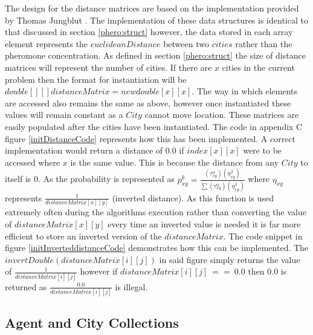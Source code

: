 The design for the distance matrices are based on the implementation provided by Thomas Jungblut \cite{tjung:aco:blog}. The implementation of these data structures is identical to that discussed in section \ref{phero:struct} however, the data stored in each array element represents the $euclideanDistance$ between two $cities$ rather than the pheromone concentration. As defined in section \ref{phero:struct} the size of distance matrices will represent the number of cities. If there are $x$ cities in the current problem then the format for instantiation will be $double[][] distanceMatrix = new double[x][x]$. The way in which elements are accessed also remains the same as above, however once instantiated these values will remain constant as a $City$ cannot move location. These matrices are easily populated after the cities have been instantiated. The code in appendix C figure \ref{initDistanceCode} represents how this has been implemented. A correct implementation would return a distance of $0.0$ if $index[x][x]$ were to be accessed where $x$ is the same value. This is because the distance from any $City$ to itself is 0.
As the probability is represented as $p_{xy}^{k} = \frac{(\tau_{xy}^{\alpha })(\eta _{xy}^{\beta })}{\sum (\tau_{xy}^{\alpha })(\eta _{xy}^{\beta })}$ where $\eta _{xy}$ represents $\frac{1}{distanceMatrix[x][y]}$ (inverted distance). As this function is used extremely often during the algorithms execution rather than converting the value of $distanceMatrix[x][y]$ every time an inverted value is needed it is far more efficient to store an inverted version of the $distanceMatrix$. The code snippet in figure \ref{initInverteddistanceCode} demonstrates how this can be implemented. The $invertDouble(distanceMatrix[i][j])$ in said figure simply returns the value of $\frac{1}{distanceMatrix[i][j]}$ however if $distanceMatrix[i][j]\ ==\ 0.0$ then $0.0$ is returned as $\frac{0.0}{distanceMatrix[i][j]}$ is illegal.
  
\subsection{Agent and City Collections}

